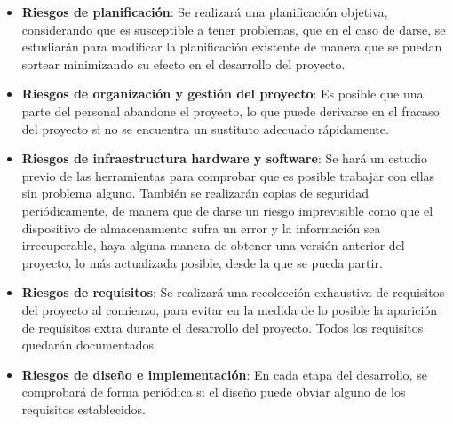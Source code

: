 \begin{itemize}

    \item \textbf{Riesgos de planificación}: Se realizará una planificación objetiva, considerando que 
    es susceptible a tener problemas, que en el caso de darse, se estudiarán para modificar la planificación 
    existente de manera que se puedan sortear minimizando su efecto en el desarrollo del proyecto.

    \item \textbf{Riesgos de organización y gestión del proyecto}: Es posible que una parte del personal 
    abandone el proyecto, lo que puede derivarse en el fracaso del proyecto si no se encuentra un sustituto 
    adecuado rápidamente.
    \newpage
    \item \textbf{Riesgos de infraestructura hardware y software}: Se hará un estudio previo de las herramientas para 
    comprobar que es posible trabajar con ellas sin problema alguno. También se realizarán copias de seguridad periódicamente, 
    de manera que de darse un riesgo imprevisible como que el dispositivo de almacenamiento sufra un error y la información 
    sea irrecuperable, haya alguna manera de obtener una versión anterior del proyecto, lo más actualizada posible, desde la que 
    se pueda partir. 

    \item \textbf{Riesgos de requisitos}: Se realizará una recolección exhaustiva de requisitos del proyecto al comienzo, para 
    evitar en la medida de lo posible la aparición de requisitos extra durante el desarrollo del proyecto. Todos los requisitos 
    quedarán documentados.

    \item \textbf{Riesgos de diseño e implementación}: En cada etapa del desarrollo, se comprobará de forma periódica si el diseño 
    puede obviar alguno de los requisitos establecidos.

\end{itemize}
